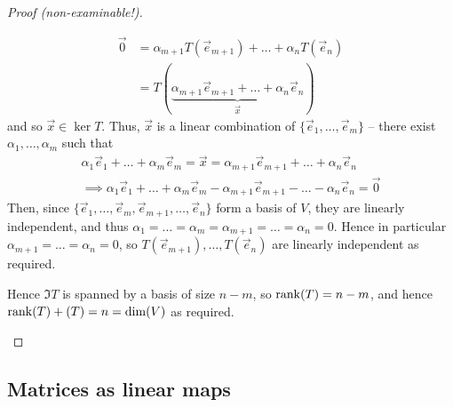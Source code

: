 \documentclass{../template/note}
\begin{document}
\begin{proof}[Proof (non-examinable!)]
\begin{enumerate}
\begin{enumerate}
\begin{align*}
                    \vec 0 &= \alpha_{m+1} T(\vec e_{m+1})+ \dots + \alpha_n T(\vec e_n) \\
                    &= T(\underbrace{\alpha_{m+1} \vec e_{m+1}+ \dots + \alpha_n \vec e_n}_{\vec x})
                \end{align*}
                and so \(\vec x \in \ker T\). Thus, \(\vec x\) is a linear combination of \(\{\vec e_1, \dots, \vec e_m\}\) -- there exist \(\alpha_1, \dots, \alpha_m\) such that
                \begin{align*}
                    \alpha_1 \vec e_1 + \dots + \alpha_m \vec e_m = \vec x = \alpha_{m+1} \vec e_{m+1} + \dots + \alpha_n \vec e_n \\
                    \implies \alpha_1 \vec e_1 + \dots + \alpha_m \vec e_m - \alpha_{m+1} \vec e_{m+1} - \dots - \alpha_n \vec e_n = \vec 0
                \end{align*}
                Then, since \(\{\vec e_1, \dots, \vec e_m, \vec e_{m+1}, \dots, \vec e_n\}\) form a basis of \(V\), they are linearly independent, and thus \(\alpha_1 = \dots = \alpha_m = \alpha_{m+1} = \dots = \alpha_n = 0\). Hence in particular \(\alpha_{m+1} = \dots = \alpha_n = 0\), so \(T(\vec e_{m+1}), \dots, T(\vec e_n)\) are linearly independent as required.             
            \end{enumerate}
            Hence \(\Im T\) is spanned by a basis of size \(n-m\), so \(\operatorname{rank}(T) = n-m\), and hence \(\rank(T) + \null(T) = n = \dim(V)\) as required.
            
        \end{enumerate}
        
        
    \end{proof}
    
    \subsection{Matrices as linear maps}
\end{document}
